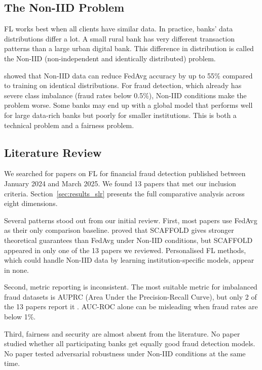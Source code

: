 \documentclass[12pt, a4paper]{article}
\begin{document}
\subsection{The Non-IID Problem}

FL works best when all clients have similar data. In practice, banks' data distributions differ a lot. A small rural bank has very different transaction patterns than a large urban digital bank. This difference in distribution is called the Non-IID (non-independent and identically distributed) problem.

\citet{zhao2018federated} showed that Non-IID data can reduce FedAvg accuracy by up to 55\% compared to training on identical distributions. For fraud detection, which already has severe class imbalance (fraud rates below 0.5\%), Non-IID conditions make the problem worse. Some banks may end up with a global model that performs well for large data-rich banks but poorly for smaller institutions. This is both a technical problem and a fairness problem.

\subsection{Literature Review}

We searched for papers on FL for financial fraud detection published between January 2024 and March 2025. We found 13 papers that met our inclusion criteria. Section~\ref{sec:results_slr} presents the full comparative analysis across eight dimensions.

Several patterns stood out from our initial review. First, most papers use FedAvg as their only comparison baseline. \citet{karimireddy2020} proved that SCAFFOLD gives stronger theoretical guarantees than FedAvg under Non-IID conditions, but SCAFFOLD appeared in only one of the 13 papers we reviewed. Personalised FL methods, which could handle Non-IID data by learning institution-specific models, appear in none.

Second, metric reporting is inconsistent. The most suitable metric for imbalanced fraud datasets is AUPRC (Area Under the Precision-Recall Curve), but only 2 of the 13 papers report it \citep{kamalaruban2024fairness}. AUC-ROC alone can be misleading when fraud rates are below 1\%.

Third, fairness and security are almost absent from the literature. No paper studied whether all participating banks get equally good fraud detection models. No paper tested adversarial robustness under Non-IID conditions at the same time.
\end{document}

